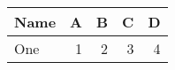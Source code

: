 \begin{tabular}{lrrrr}
  \toprule
  Name & A & B & C & D \\
  \midrule
  One & 1 & 2 & 3 & 4 \\
  \bottomrule
\end{tabular}
